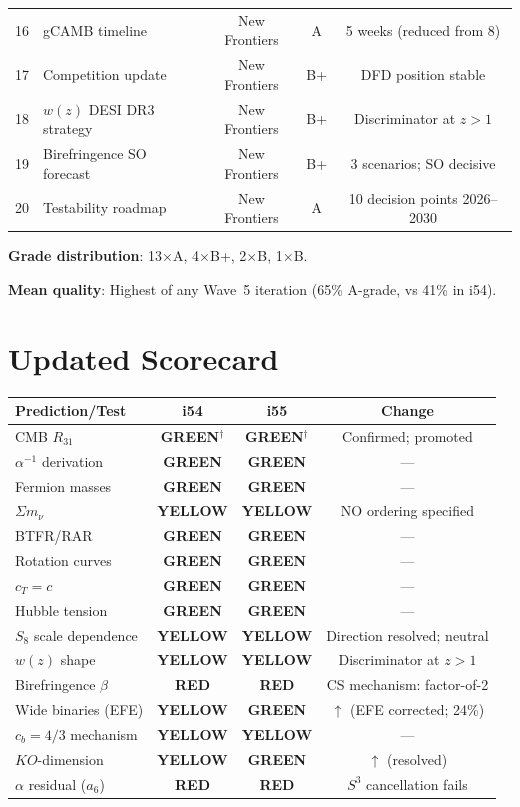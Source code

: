 \documentclass[11pt,a4paper]{article}
\newcommand{\GREEN}{\textcolor{dfdgreen}{\textbf{GREEN}}}
\newcommand{\YELLOW}{\textcolor{dfdyellow}{\textbf{YELLOW}}}
\newcommand{\RED}{\textcolor{dfdred}{\textbf{RED}}}
\begin{document}
\begin{center}
\begin{longtable}{clccc}
16 & gCAMB timeline & New Frontiers & A & 5 weeks (reduced from 8) \\
17 & Competition update & New Frontiers & B+ & DFD position stable \\
18 & $w(z)$ DESI DR3 strategy & New Frontiers & B+ & Discriminator at $z > 1$ \\
19 & Birefringence SO forecast & New Frontiers & B+ & 3 scenarios; SO decisive \\
20 & Testability roadmap & New Frontiers & A & 10 decision points 2026--2030 \\
\bottomrule
\end{longtable}
\end{center}

\textbf{Grade distribution}: 13$\times$A, 4$\times$B+, 2$\times$B, 1$\times$B.

\textbf{Mean quality}: Highest of any Wave~5 iteration (65\% A-grade, vs 41\% in i54).


\section{Updated Scorecard}
\label{sec:scorecard}

\begin{center}
\begin{longtable}{p{5cm}ccc}
\toprule
\textbf{Prediction/Test} & \textbf{i54} & \textbf{i55} & \textbf{Change} \\
\midrule
CMB $R_{31}$ & \GREEN$^\dagger$ & \GREEN$^\dagger$ & Confirmed; promoted \\
$\alpha^{-1}$ derivation & \GREEN & \GREEN & --- \\
Fermion masses & \GREEN & \GREEN & --- \\
$\Sigma m_\nu$ & \YELLOW & \YELLOW & NO ordering specified \\
BTFR/RAR & \GREEN & \GREEN & --- \\
Rotation curves & \GREEN & \GREEN & --- \\
$c_T = c$ & \GREEN & \GREEN & --- \\
Hubble tension & \GREEN & \GREEN & --- \\
$S_8$ scale dependence & \YELLOW & \YELLOW & Direction resolved; neutral \\
$w(z)$ shape & \YELLOW & \YELLOW & Discriminator at $z > 1$ \\
Birefringence $\beta$ & \RED & \RED & CS mechanism: factor-of-2 \\
Wide binaries (EFE) & \YELLOW & \GREEN & $\uparrow$ (EFE corrected; 24\%) \\
$c_b = 4/3$ mechanism & \YELLOW & \YELLOW & --- \\
$KO$-dimension & \YELLOW & \GREEN & $\uparrow$ (resolved) \\
$\alpha$ residual ($a_6$) & \RED & \RED & $S^3$ cancellation fails \\
\bottomrule
\end{longtable}
\end{center}
\end{document}
